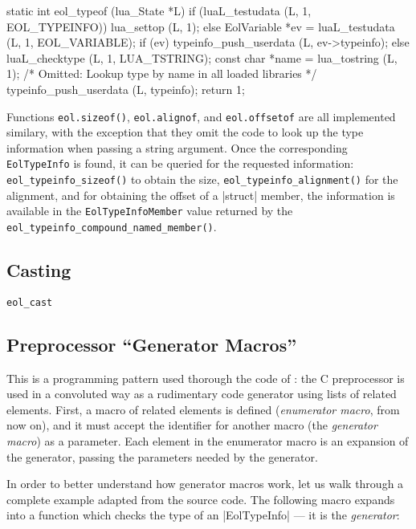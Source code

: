 \begin{ccode}
static int
eol_typeof (lua_State *L) {
  if (luaL_testudata (L, 1, EOL_TYPEINFO)) {
    lua_settop (L, 1);
  } else {
    EolVariable *ev = luaL_testudata (L, 1, EOL_VARIABLE);
    if (ev) {
      typeinfo_push_userdata (L, ev->typeinfo);
    } else {
      luaL_checktype (L, 1, LUA_TSTRING);
      const char *name = lua_tostring (L, 1);
      /* Omitted: Lookup type by name in all loaded libraries */
      typeinfo_push_userdata (L, typeinfo);
    }
  }
  return 1;
}
\end{ccode}

Functions \verb|eol.sizeof()|, \verb|eol.alignof|, and \verb|eol.offsetof| are
all implemented similary, with the exception that they omit the code to look
up the type information when passing a string argument. Once the corresponding
\verb|EolTypeInfo| is found, it can be queried for the requested information:
\verb|eol_typeinfo_sizeof()| to obtain the size,
\verb|eol_typeinfo_alignment()| for the alignment, and for obtaining the offset
of a \Mc|struct| member, the information is available in the
\verb|EolTypeInfoMember| value returned by the
\verb|eol_typeinfo_compound_named_member()|.

\subsection{Casting}

  \verb|eol_cast|


\subsection{Preprocessor “Generator Macros”}
  \label{sec:cpp-abuse-genmacros}

This is a programming pattern used thorough the code of \Eol*: the
C preprocessor is used in a convoluted way as a rudimentary code generator
using lists of related elements. First, a macro of related elements is defined
(\emph{enumerator macro}, from now on), and it must accept the identifier for
another macro (the \emph{generator macro}) as a parameter. Each element in the
enumerator macro is an expansion of the generator, passing the parameters
needed by the generator.

In order to better understand how generator macros work, let us walk through
a complete example adapted from the \Eol* source code. The following macro
expands into a function which checks the type of an \Mc|EolTypeInfo| — it is
the \emph{generator}:

